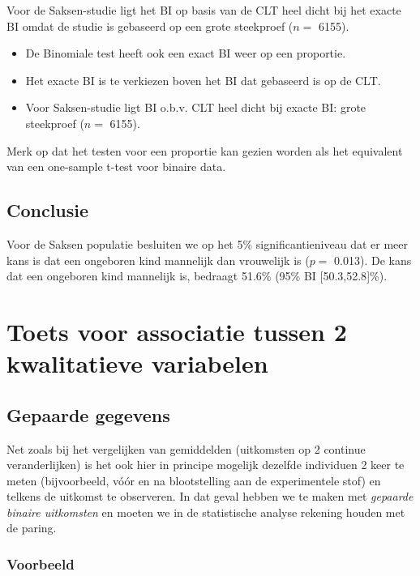 \documentclass[
  dutch,
  letterpaper,
  12pt]{book}
\theoremstyle{definition}
\theoremstyle{definition}
\theoremstyle{definition}
\theoremstyle{remark}
\begin{document}
Voor de Saksen-studie ligt het BI op basis van de CLT heel dicht bij het
exacte BI omdat de studie is gebaseerd op een grote steekproef (\(n=\)
6155).

\begin{itemize}
\item
  De Binomiale test heeft ook een exact BI weer op een proportie.
\item
  Het exacte BI is te verkiezen boven het BI dat gebaseerd is op de CLT.
\item
  Voor Saksen-studie ligt BI o.b.v. CLT heel dicht bij exacte BI: grote
  steekproef (\(n=\) 6155).
\end{itemize}

Merk op dat het testen voor een proportie kan gezien worden als het
equivalent van een one-sample t-test voor binaire data.

\subsection{Conclusie}\label{conclusie}

Voor de Saksen populatie besluiten we op het 5\% significantieniveau dat
er meer kans is dat een ongeboren kind mannelijk dan vrouwelijk is
(\(p=\) 0.013). De kans dat een ongeboren kind mannelijk is, bedraagt
51.6\% (95\% BI {[}50.3,52.8{]}\%).

\section{Toets voor associatie tussen 2 kwalitatieve
variabelen}\label{toets-voor-associatie-tussen-2-kwalitatieve-variabelen}

\subsection{Gepaarde gegevens}\label{gepaarde-gegevens}

Net zoals bij het vergelijken van gemiddelden (uitkomsten op 2 continue
veranderlijken) is het ook hier in principe mogelijk dezelfde individuen
2 keer te meten (bijvoorbeeld, vóór en na blootstelling aan de
experimentele stof) en telkens de uitkomst te observeren. In dat geval
hebben we te maken met \emph{gepaarde binaire uitkomsten} en moeten we
in de statistische analyse rekening houden met de paring.

\subsubsection{Voorbeeld}\label{voorbeeld}
\end{document}
